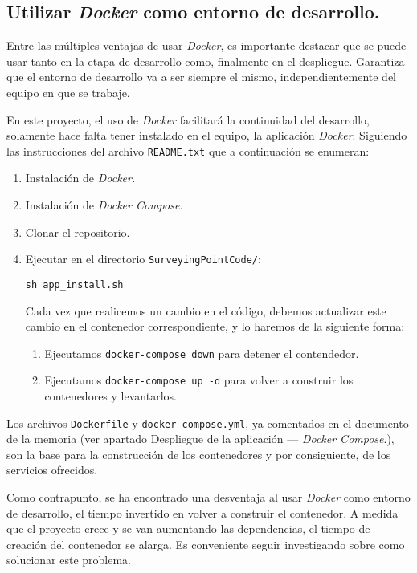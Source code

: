 \subsection{Utilizar \emph{Docker} como entorno de desarrollo.}

Entre las múltiples ventajas de usar \emph{Docker}, es importante destacar que se puede usar tanto en la etapa de desarrollo como, finalmente en el despliegue. Garantiza que el entorno de desarrollo va a ser siempre el mismo, independientemente del equipo en que se trabaje.

En este proyecto, el uso de \emph{Docker} facilitará la continuidad del desarrollo, solamente hace falta tener instalado en el equipo, la aplicación \emph{Docker}. Siguiendo las instrucciones del archivo \texttt{README.txt} que a continuación se enumeran:

\begin{enumerate}
\item Instalación de \emph{Docker.}
\item Instalación de \emph{Docker Compose.}
\item Clonar el repositorio.
\item Ejecutar en el directorio \texttt{SurveyingPointCode/}:

\texttt{sh app\_install.sh}

Cada vez que realicemos un cambio en el código, debemos actualizar este cambio en el contenedor correspondiente, y lo haremos de la siguiente forma:
\begin{enumerate}

\item Ejecutamos \texttt{docker-compose down} para detener el contendedor.

\item Ejecutamos \texttt{docker-compose up -d} para volver a construir los contenedores y levantarlos.
\end{enumerate}

\end{enumerate}

Los archivos \texttt{Dockerfile} y \texttt{docker-compose.yml}, ya comentados en el documento de la memoria (ver apartado Despliegue de la aplicación — \emph{Docker Compose}.), son la base para la construcción de los contenedores y por consiguiente, de los servicios ofrecidos. 

Como contrapunto, se ha encontrado una desventaja al usar \emph{Docker} como entorno de desarrollo, el tiempo invertido en volver a construir el contenedor. A medida que el proyecto crece y se van aumentando las dependencias, el tiempo de creación del contenedor se alarga. Es conveniente seguir investigando sobre como solucionar este problema.

